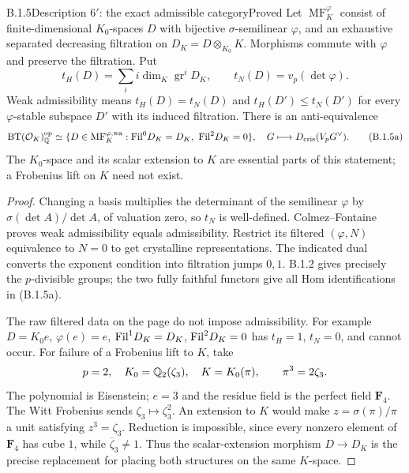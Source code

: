 \begin{result}{B.1.5}{Description $6'$: the exact admissible category}{Proved}
Let $\operatorname{MF}_K^\varphi$ consist of finite-dimensional
$K_0$-spaces $D$ with bijective $\sigma$-semilinear $\varphi$, and
an exhaustive separated decreasing filtration on $D_K=D\otimes_{K_0}K$.
Morphisms commute with $\varphi$ and preserve the filtration. Put
\[
 t_H(D)=\sum_i i\dim_K\operatorname{gr}^iD_K,\qquad
 t_N(D)=v_p(\det\varphi).
\]
Weak admissibility means $t_H(D)=t_N(D)$ and
$t_H(D')\leq t_N(D')$ for every $\varphi$-stable subspace $D'$
with its induced filtration. There is an anti-equivalence
\[
 \operatorname{BT}(\mathcal O_K)_\mathbb Q^{\mathrm{op}}\simeq
 \{D\in\operatorname{MF}_K^{\varphi,\mathrm{wa}}:
                          \mathrm{Fil}^0D_K=D_K,\ \mathrm{Fil}^2D_K=0\},
 \quad G\longmapsto D_{\mathrm{cris}}(V_pG^\vee).
 \tag{B.1.5a}
\]
The $K_0$-space and its scalar extension to $K$ are essential parts
of this statement; a Frobenius lift on $K$ need not exist.
\end{result}
\begin{proof}
Changing a basis multiplies the determinant of the semilinear
$\varphi$ by $\sigma(\det A)/\det A$, of valuation zero, so $t_N$
is well-defined. Colmez--Fontaine~\cite[Theorem A, Proposition 4.2,
Theorem 4.3 and its corollary]{ColmezFontaine2000} proves weak
admissibility equals admissibility. Restrict its filtered
$(\varphi,N)$ equivalence to $N=0$ to get crystalline
representations. The indicated dual converts the exponent
condition into filtration jumps $0,1$. B.1.2 gives precisely the
$p$-divisible groups; the two fully faithful functors give all
Hom identifications in (B.1.5a).

The raw filtered data on the page do not impose admissibility.
For example $D=K_0e$, $\varphi(e)=e$, $\mathrm{Fil}^1D_K=D_K$,
$\mathrm{Fil}^2D_K=0$ has $t_H=1$, $t_N=0$, and cannot occur.
For failure of a Frobenius lift to $K$, take
\[
 p=2,\quad K_0=\mathbb Q_2(\zeta_3),\quad
 K=K_0(\pi),\qquad \pi^3=2\zeta_3.
\]
The polynomial is Eisenstein; $e=3$ and the residue field is the
perfect field $\mathbf F_4$. The Witt Frobenius sends
$\zeta_3\mapsto\zeta_3^2$. An extension to $K$ would make
$z=\sigma(\pi)/\pi$ a unit satisfying $z^3=\zeta_3$.
Reduction is impossible, since every nonzero element of
$\mathbf F_4$ has cube $1$, while $\overline\zeta_3\ne1$.
Thus the scalar-extension morphism $D\to D_K$ is the precise
replacement for placing both structures on the same $K$-space.
\end{proof}


